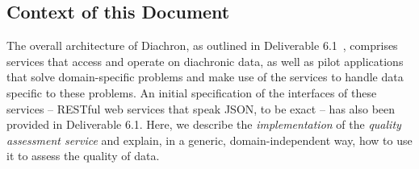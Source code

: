
\subsection{Context of this Document}
\label{sec:ContextDoc} 

The overall architecture of Diachron, as outlined in Deliverable 6.1~\cite{diachron-d6.1}, comprises services that access and operate on diachronic data, as well as pilot applications that solve domain-specific problems and make use of the services to handle data specific to these problems.  An initial specification of the interfaces of these services – RESTful web services that speak JSON, to be exact – has also been provided in Deliverable 6.1.  Here, we describe the \emph{implementation} of the \emph{quality assessment service} and explain, in a generic, domain-independent way, how to use it to assess the quality of data.

